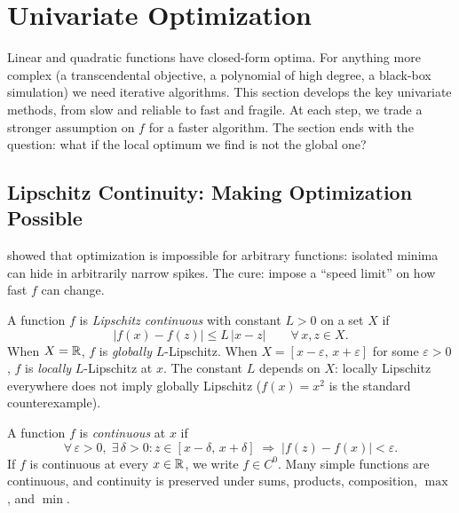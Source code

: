 \section{Univariate Optimization}\label{sec:univariate}

Linear and quadratic functions have closed-form optima.
For anything more complex (a transcendental objective, a polynomial of high degree, a black-box simulation) we need iterative algorithms.
This section develops the key univariate methods, from slow and reliable to fast and fragile. At each step, we trade a stronger assumption on $f$ for a faster algorithm. The section ends with the question: what if the local optimum we find is not the global one?


\subsection{Lipschitz Continuity: Making Optimization Possible}\label{sec:lipschitz}

 showed that optimization is impossible for arbitrary functions: isolated minima can hide in arbitrarily narrow spikes.
The cure: impose a ``speed limit'' on how fast $f$ can change.

\begin{definition}\label{def:lipschitz}
	A function $f$ is \textit{Lipschitz continuous} with constant $L > 0$ on a set $X$ if
	\begin{equation}\label{eq:lipschitz-condition}
		|f(x) - f(z)| \leq L\, |x - z| \qquad \forall\, x, z \in X.
	\end{equation}
	When $X = \mathbb{R}$, $f$ is \textit{globally} $L$-Lipschitz.
	When $X = [x - \varepsilon,\, x + \varepsilon]$ for some $\varepsilon > 0$, $f$ is \textit{locally} $L$-Lipschitz at $x$.
	The constant $L$ depends on $X$: locally Lipschitz everywhere does not imply globally Lipschitz ($f(x) = x^2$ is the standard counterexample).
\end{definition}

\begin{definition}[Continuity]\label{def:continuity}
	A function $f$ is \textit{continuous} at $x$ if
	\begin{equation}\label{eq:continuity}
		\forall\, \varepsilon > 0,\; \exists\, \delta > 0 :
		z \in [x - \delta,\, x + \delta]
		\;\Rightarrow\; |f(z) - f(x)| < \varepsilon.
	\end{equation}
	If $f$ is continuous at every $x \in \mathbb{R}$, we write $f \in C^0$.
	Many simple functions are continuous, and continuity is preserved under sums, products, composition, $\max$, and $\min$.
\end{definition}

